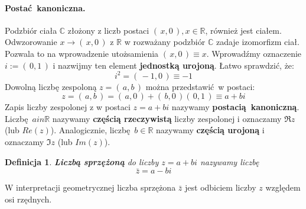 \documentclass{article}
\newcommand*\conj[1]{\bar{#1}}
\newtheorem{definition}{Definicja}[section]
\begin{document}
    \paragraph{Postać kanoniczna.} Podzbiór ciała $\mathds{C}$ złożony z liczb postaci $(\,x,0\,), x \in \mathds{R}$, również jest ciałem. Odwzorowanie $x \rightarrow (\,x,0\,)$ z $\mathds{R}$ w rozważany podzbiór $\mathds{C}$ zadaje izomorfizm ciał. Pozwala to na wprowadzenie utożsamienia $(\,x,0\,) \equiv x$. Wprowadźmy oznaczenie $i := (\,0,1\,)$ i nazwijmy ten element \textbf{jednostką urojoną}. Łatwo sprawdzić, że:
    \begin{equation*}
        i^2 = (\,-1,0\,) \equiv -1
    \end{equation*}
    Dowolną liczbę zespoloną $z = (\,a,b\,)$ można przedstawić w postaci:
    \begin{equation*}
        z = (\,a,b\,) = (\,a,0\,) + (\,b,0\,)(\,0,1\,) \equiv a+bi
    \end{equation*}
    Zapis liczby zespolonej z w postaci $z = a+bi$ nazywamy \textbf{postacią kanoniczną}. Liczbę $a in \mathds{R}$ nazywamy \textbf{częścią rzeczywistą} liczby zespolonej i oznaczamy $\Re{z}$ (lub $Re(z)$). Analogicznie, liczbę $b \in \mathds{R}$ nazywamy \textbf{częścią urojoną} i oznaczamy $\Im{z}$ (lub $Im(z)$).
    \begin{definition}
        \textbf{Liczbą sprzężoną} do liczby $z = a+bi$ nazywamy liczbę
        \begin{equation*}
            \conj{z} = a-bi
        \end{equation*}
    \end{definition}
    \begin{center}
    \end{center}
    W interpretacji geometrycznej liczba sprzężona $\conj{z}$ jest odbiciem liczby $z$ względem osi rzędnych.
\end{document}
